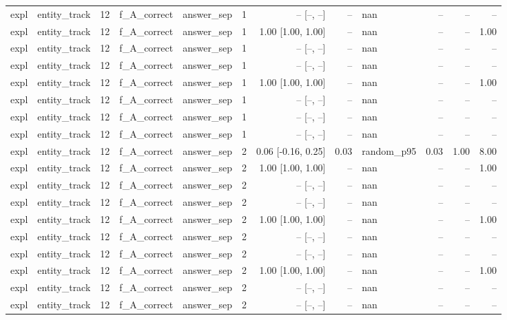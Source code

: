 \begin{tabular}{llrllrrrlrrr}
expl & entity\_track & 12 & f\_A\_correct & answer\_sep & 1 & -- [--, --] & -- & nan & -- & -- & -- \\
expl & entity\_track & 12 & f\_A\_correct & answer\_sep & 1 & 1.00 [1.00, 1.00] & -- & nan & -- & -- & 1.00 \\
expl & entity\_track & 12 & f\_A\_correct & answer\_sep & 1 & -- [--, --] & -- & nan & -- & -- & -- \\
expl & entity\_track & 12 & f\_A\_correct & answer\_sep & 1 & -- [--, --] & -- & nan & -- & -- & -- \\
expl & entity\_track & 12 & f\_A\_correct & answer\_sep & 1 & 1.00 [1.00, 1.00] & -- & nan & -- & -- & 1.00 \\
expl & entity\_track & 12 & f\_A\_correct & answer\_sep & 1 & -- [--, --] & -- & nan & -- & -- & -- \\
expl & entity\_track & 12 & f\_A\_correct & answer\_sep & 1 & -- [--, --] & -- & nan & -- & -- & -- \\
expl & entity\_track & 12 & f\_A\_correct & answer\_sep & 1 & -- [--, --] & -- & nan & -- & -- & -- \\
expl & entity\_track & 12 & f\_A\_correct & answer\_sep & 2 & 0.06 [-0.16, 0.25] & 0.03 & random\_p95 & 0.03 & 1.00 & 8.00 \\
expl & entity\_track & 12 & f\_A\_correct & answer\_sep & 2 & 1.00 [1.00, 1.00] & -- & nan & -- & -- & 1.00 \\
expl & entity\_track & 12 & f\_A\_correct & answer\_sep & 2 & -- [--, --] & -- & nan & -- & -- & -- \\
expl & entity\_track & 12 & f\_A\_correct & answer\_sep & 2 & -- [--, --] & -- & nan & -- & -- & -- \\
expl & entity\_track & 12 & f\_A\_correct & answer\_sep & 2 & 1.00 [1.00, 1.00] & -- & nan & -- & -- & 1.00 \\
expl & entity\_track & 12 & f\_A\_correct & answer\_sep & 2 & -- [--, --] & -- & nan & -- & -- & -- \\
expl & entity\_track & 12 & f\_A\_correct & answer\_sep & 2 & -- [--, --] & -- & nan & -- & -- & -- \\
expl & entity\_track & 12 & f\_A\_correct & answer\_sep & 2 & 1.00 [1.00, 1.00] & -- & nan & -- & -- & 1.00 \\
expl & entity\_track & 12 & f\_A\_correct & answer\_sep & 2 & -- [--, --] & -- & nan & -- & -- & -- \\
expl & entity\_track & 12 & f\_A\_correct & answer\_sep & 2 & -- [--, --] & -- & nan & -- & -- & -- \\

\end{tabular}

